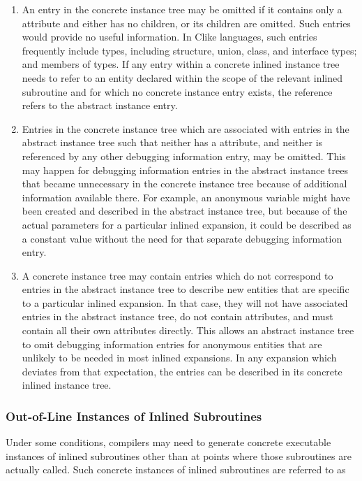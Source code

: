 \begin{enumerate}[1. ]
\item An entry in the concrete instance tree may be omitted if
it contains only a 
\DWATabstractorigin{} attribute and either
has no children, or its children are omitted. Such entries
would provide no useful information. In C\dash like languages,
such entries frequently include types, including structure,
union, class, and interface types; and members of types. If any
entry within a concrete inlined instance tree needs to refer
to an entity declared within the scope of the relevant inlined
subroutine and for which no concrete instance entry exists,
the reference refers to the abstract instance entry.

\item Entries in the concrete instance tree which are associated
with entries in the abstract instance tree such that neither
has a \DWATname{} attribute,
and neither is referenced by
any other debugging information entry, may be omitted. This
may happen for debugging information entries in the abstract
instance trees that became unnecessary in the concrete instance
tree because of additional information available there. For
example, an anonymous variable might have been created and
described in the abstract instance tree, but because of
the actual parameters for a particular inlined expansion,
it could be described as a constant value without the need
for that separate debugging information entry.

\item A concrete instance tree may contain entries which do
not correspond to entries in the abstract instance tree
to describe new entities that are specific to a particular
inlined expansion. In that case, they will not have associated
entries in the abstract instance tree, do not contain
\DWATabstractorigin{} attributes, and must contain all their
own attributes directly. This allows an abstract instance tree
to omit debugging information entries for anonymous entities
that are unlikely to be needed in most inlined expansions. In
any expansion which deviates from that expectation, the
entries can be described in its concrete inlined instance tree.

\end{enumerate}

\subsubsection{Out-of-Line Instances of Inlined Subroutines}
\label{chap:outoflineinstancesofinlinedsubroutines}
Under some conditions, compilers may need to generate concrete
executable instances of inlined subroutines other than at
points where those subroutines are actually called. Such
concrete instances of inlined subroutines are referred to as

